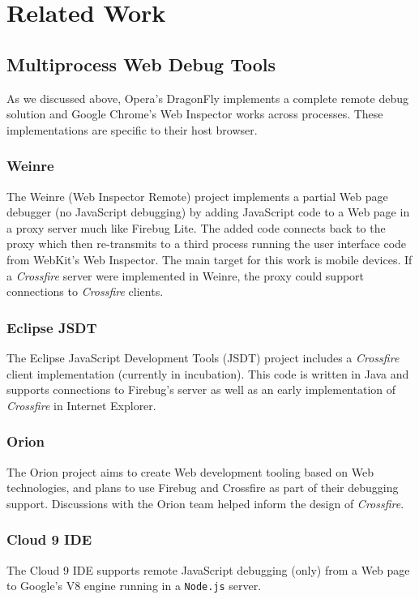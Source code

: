 
\section{Related Work}
\subsection{Multiprocess Web Debug Tools}
As we discussed above,
Opera's DragonFly\cite{opera-dragonfly} implements a complete remote debug
solution and Google Chrome's Web Inspector works across processes. These implementations are specific to their host browser.


\subsubsection{Weinre}
The Weinre (Web Inspector Remote)\cite{weinre} project implements a partial Web page debugger (no JavaScript debugging) by
adding JavaScript code to a Web page in a proxy server much like Firebug Lite. The
added code connects back to the proxy which then re-transmits to a third process running
the user interface code
from WebKit's Web Inspector. The main target for this work is mobile devices. If
a \textit{Crossfire} server were implemented in Weinre, the proxy could support connections to
 \textit{Crossfire} clients.

\subsubsection{Eclipse JSDT}
The Eclipse JavaScript Development Tools (JSDT) project\cite{EclipseJSDT}
includes a \textit{Crossfire} client implementation (currently in incubation).
 This code is written in Java and supports
connections to Firebug's server as well as an early implementation of \textit{Crossfire} in Internet Explorer.

\subsubsection{Orion}
The Orion project\cite{orion} aims to create Web development tooling based on
Web technologies, and plans to use Firebug and Crossfire as part of their
debugging support. Discussions with the Orion team helped inform the design of \textit{Crossfire}.

\subsubsection{Cloud 9 IDE}
The Cloud 9 IDE\cite{cloud9} supports remote JavaScript debugging (only) from a Web page to Google's V8
engine running in a \texttt{Node.js} server.


